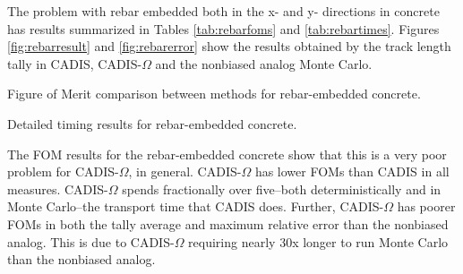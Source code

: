 The problem with rebar embedded both in the x- and y- directions
in concrete has
results summarized in Tables
\ref{tab:rebarfoms} and \ref{tab:rebartimes}. Figures
\ref{fig:rebarresult} and \ref{fig:rebarerror} show the results obtained
by the track length tally in CADIS, CADIS-$\Omega$ and the nonbiased analog
Monte Carlo.

\begin{table}[h!]
  \centering
  
  \caption[Figure of Merit comparison between methods for rebar-embedded
  concrete.]{Figure of Merit comparison between methods for rebar-embedded
  concrete.}
  \label{tab:rebarfoms}
\end{table}

\begin{table}[h!]
  \centering
  
  \caption[Detailed timing results for rebar-embedded concrete]
  {Detailed timing results for rebar-embedded concrete.}
  \label{tab:rebartimes}
\end{table}

The FOM results for the rebar-embedded concrete show that this is a very poor
problem for CADIS-$\Omega$, in general. CADIS-$\Omega$ has lower FOMs than CADIS
in all measures. CADIS-$\Omega$ spends fractionally over five--both
deterministically and in Monte Carlo--the
transport time that CADIS does. Further, CADIS-$\Omega$ has poorer FOMs in both
the tally average and maximum relative error than the nonbiased analog. This is
due to CADIS-$\Omega$ requiring nearly 30x longer to run Monte Carlo than the
nonbiased analog.

